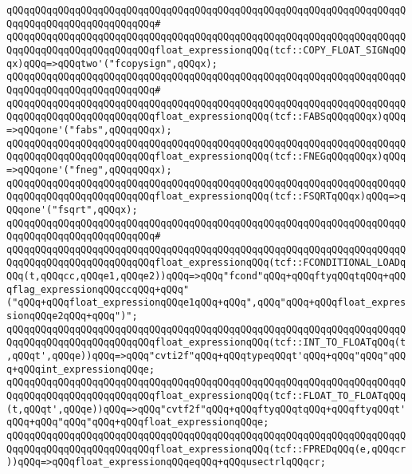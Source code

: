 \verb|qQQqqQQqqQQqqQQqqQQqqQQqqQQqqQQqqQQqqQQqqQQqqQQqqQQqqQQqqQQqqQQqqQQqqQQqqQQqqQQqqQQqqQQqqQQqqQQq#|\newline
\verb|qQQqqQQqqQQqqQQqqQQqqQQqqQQqqQQqqQQqqQQqqQQqqQQqqQQqqQQqqQQqqQQqqQQqqQQqqQQqqQQqqQQqqQQqqQQqqQQqfloat_expressionqQQq(tcf::COPY_FLOAT_SIGNqQQqx)qQQq=>qQQqtwo'("fcopysign",qQQqx);|\newline
\verb|qQQqqQQqqQQqqQQqqQQqqQQqqQQqqQQqqQQqqQQqqQQqqQQqqQQqqQQqqQQqqQQqqQQqqQQqqQQqqQQqqQQqqQQqqQQqqQQq#|\newline
\verb|qQQqqQQqqQQqqQQqqQQqqQQqqQQqqQQqqQQqqQQqqQQqqQQqqQQqqQQqqQQqqQQqqQQqqQQqqQQqqQQqqQQqqQQqqQQqqQQqfloat_expressionqQQq(tcf::FABSqQQqqQQqx)qQQq=>qQQqone'("fabs",qQQqqQQqx);|\newline
\verb|qQQqqQQqqQQqqQQqqQQqqQQqqQQqqQQqqQQqqQQqqQQqqQQqqQQqqQQqqQQqqQQqqQQqqQQqqQQqqQQqqQQqqQQqqQQqqQQqfloat_expressionqQQq(tcf::FNEGqQQqqQQqx)qQQq=>qQQqone'("fneg",qQQqqQQqx);|\newline
\verb|qQQqqQQqqQQqqQQqqQQqqQQqqQQqqQQqqQQqqQQqqQQqqQQqqQQqqQQqqQQqqQQqqQQqqQQqqQQqqQQqqQQqqQQqqQQqqQQqfloat_expressionqQQq(tcf::FSQRTqQQqx)qQQq=>qQQqone'("fsqrt",qQQqx);|\newline
\verb|qQQqqQQqqQQqqQQqqQQqqQQqqQQqqQQqqQQqqQQqqQQqqQQqqQQqqQQqqQQqqQQqqQQqqQQqqQQqqQQqqQQqqQQqqQQqqQQq#|\newline
\verb|qQQqqQQqqQQqqQQqqQQqqQQqqQQqqQQqqQQqqQQqqQQqqQQqqQQqqQQqqQQqqQQqqQQqqQQqqQQqqQQqqQQqqQQqqQQqqQQqfloat_expressionqQQq(tcf::FCONDITIONAL_LOADqQQq(t,qQQqcc,qQQqe1,qQQqe2))qQQq=>qQQq"fcond"qQQq+qQQqftyqQQqtqQQq+qQQqflag_expressionqQQqccqQQq+qQQq"("qQQq+qQQqfloat_expressionqQQqe1qQQq+qQQq",qQQq"qQQq+qQQqfloat_expressionqQQqe2qQQq+qQQq")";|\newline
\verb|qQQqqQQqqQQqqQQqqQQqqQQqqQQqqQQqqQQqqQQqqQQqqQQqqQQqqQQqqQQqqQQqqQQqqQQqqQQqqQQqqQQqqQQqqQQqqQQqfloat_expressionqQQq(tcf::INT_TO_FLOATqQQq(t,qQQqt',qQQqe))qQQq=>qQQq"cvti2f"qQQq+qQQqtypeqQQqt'qQQq+qQQq"qQQq"qQQq+qQQqint_expressionqQQqe;|\newline
\verb|qQQqqQQqqQQqqQQqqQQqqQQqqQQqqQQqqQQqqQQqqQQqqQQqqQQqqQQqqQQqqQQqqQQqqQQqqQQqqQQqqQQqqQQqqQQqqQQqfloat_expressionqQQq(tcf::FLOAT_TO_FLOATqQQq(t,qQQqt',qQQqe))qQQq=>qQQq"cvtf2f"qQQq+qQQqftyqQQqtqQQq+qQQqftyqQQqt'qQQq+qQQq"qQQq"qQQq+qQQqfloat_expressionqQQqe;|\newline
\verb|qQQqqQQqqQQqqQQqqQQqqQQqqQQqqQQqqQQqqQQqqQQqqQQqqQQqqQQqqQQqqQQqqQQqqQQqqQQqqQQqqQQqqQQqqQQqqQQqfloat_expressionqQQq(tcf::FPREDqQQq(e,qQQqcr))qQQq=>qQQqfloat_expressionqQQqeqQQq+qQQqusectrlqQQqcr;|\newline
